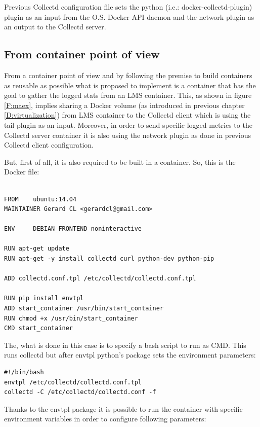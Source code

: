 Previous Collectd configuration file sets the python (i.e.: docker-collectd-plugin) plugin as an input from the O.S. Docker API daemon and the network plugin as an output to the Collectd server.

\subsection{From container point of view}

From a container point of view and by following the premise to build containers as reusable as possible what is proposed to implement is a container that has the goal to gather the logged stats from an LMS container. This, as shown in figure \ref{F:maex}, implies sharing a Docker volume (as introduced in previous chapter \ref{D:virtualization}) from LMS container to the Collectd client which is using the tail plugin as an input. Moreover, in order to send specific logged metrics to the Collectd server container it is also using the network plugin as done in previous Collectd client configuration.

But, first of all, it is also required to be built in a container. So, this is the Docker file:

\begin{verbatim}

FROM    ubuntu:14.04
MAINTAINER Gerard CL <gerardcl@gmail.com>

ENV     DEBIAN_FRONTEND noninteractive

RUN apt-get update
RUN apt-get -y install collectd curl python-dev python-pip

ADD collectd.conf.tpl /etc/collectd/collectd.conf.tpl

RUN pip install envtpl
ADD start_container /usr/bin/start_container
RUN chmod +x /usr/bin/start_container
CMD start_container

\end{verbatim}

The, what is done in this case is to specify a bash script to run as CMD. This runs collectd but after envtpl python's package sets the environment parameters:
\begin{verbatim}
#!/bin/bash
envtpl /etc/collectd/collectd.conf.tpl
collectd -C /etc/collectd/collectd.conf -f
\end{verbatim}

Thanks to the envtpl package it is possible to run the container with specific environment variables in order to configure following parameters:

